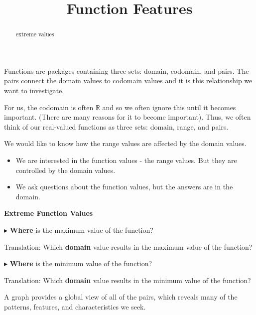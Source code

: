 \documentclass{ximera}
\title{Function Features}
\begin{document}
\begin{abstract}
extreme values
\end{abstract}
\maketitle





Functions are packages containing three sets: domain, codomain, and pairs.  The pairs connect the domain values to codomain values and it is this relationship we want to investigate.   


For us, the codomain is often $\mathbb{R}$ and so we often ignore this until it becomes important.  (There are many reasons for it to become important).  Thus, we often think of our real-valued functions as three sets: domain, range, and pairs. 


We would like to know how the range values are affected by the domain values. 


\begin{itemize}
\item We are interested in the function values - the range values.  But they are controlled by the domain values. \\
\item We ask questions about the function values, but the answers are in the domain.
\end{itemize}




\begin{idea} \textbf{\textcolor{blue!55!black}{Extreme Function Values}} 


$\blacktriangleright$ \textbf{\textcolor{purple!85!blue}{Where}} is the maximum value of the function? 

Translation: Which \textbf{\textcolor{purple!85!blue}{domain}} value results in the maximum value of the function? 


$\blacktriangleright$ \textbf{\textcolor{purple!85!blue}{Where}} is the minimum value of the function? 

Translation: Which \textbf{\textcolor{purple!85!blue}{domain}} value results in the minimum value of the function? 


\end{idea}








A graph provides a global view of all of the pairs, which reveals many of the patterns, features, and characteristics we seek.   
\end{document}
